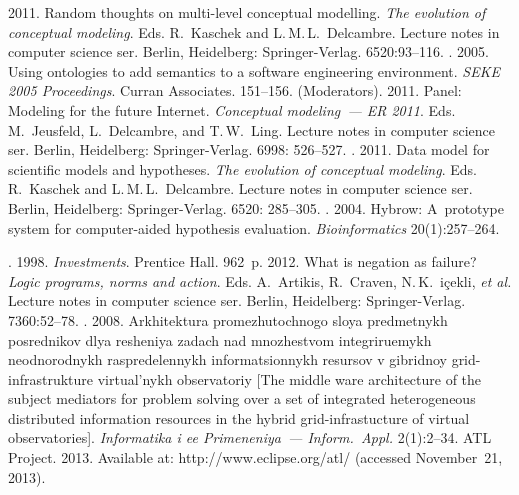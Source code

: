 \begin{multicols}{2}
{{\begin{thebibliography}{99}
 2011. Random thoughts on multi-level conceptual modelling.
\textit{The evolution of conceptual modeling}. Eds. R.~Kaschek and L.\,M.\,L.~Delcambre. Lecture notes in computer science ser.
Berlin, Heidelberg: Springer-Verlag. 6520:93--116.
. 2005. Using ontologies to add semantics
to a software engineering environment. \textit{SEKE 2005 Proceedings}. Curran
Associates. 151--156.
 (Moderators). 2011. Panel: Modeling for the future
Internet. \textit{Conceptual modeling~--- ER 2011}.
Eds. M.~Jeusfeld, L.~Delcambre, and T.\,W.~Ling. Lecture notes in
computer science ser. Berlin, Heidelberg: Springer-Verlag. 6998: 526--527.
. 2011. Data model for scientific models and
hypotheses. \textit{The evolution of conceptual modeling}. Eds. R.~Kaschek and L.\,M.\,L.~Delcambre. Lecture notes in computer science ser.
Berlin, Heidelberg: Springer-Verlag. 6520: 285--305.
. 2004. Hybrow:
A~prototype system for computer-aided hypothesis evaluation. \textit{Bioinformatics}
20(1):257--264.

. 1998. \textit{Investments}.
Prentice Hall. 962~p.
 2012. What is negation as failure? \textit{Logic programs, norms and
action}. Eds. A.~Artikis, R.~Craven, N.\,K.~i{\!\ptb\c{c}}ekli, \textit{et al.}
Lecture notes in computer science ser. Berlin, Heidelberg:
Springer-Verlag. 7360:52--78.
. 2008.
Arkhitektura promezhutochnogo sloya predmetnykh posrednikov dlya resheniya zadach nad
mnozhestvom integriruemykh neodnorodnykh raspredelennykh informatsionnykh resursov v
gibridnoy grid-infrastrukture virtual'nykh observatoriy [The middle ware architecture of the
subject mediators for problem solving over a set of integrated heterogeneous distributed
information resources in the hybrid grid-infrastucture of virtual observatories].
\textit{Informatika i ee Primeneniya~---
Inform.\ Appl.} 2(1):2--34.
ATL Project. 2013. Available at: {\sf http://www.eclipse.org/\linebreak atl/} (accessed November~21, 2013).

\end{thebibliography} } }

\end{multicols}

